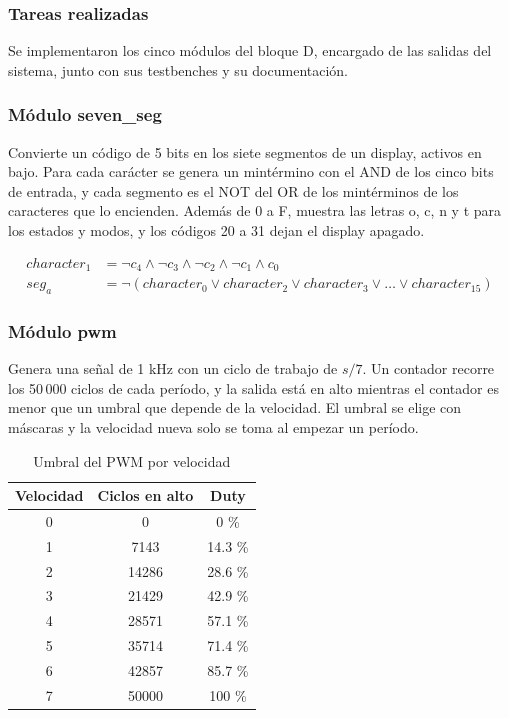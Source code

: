 \documentclass[11pt,letterpaper]{article}
\begin{document}
\subsubsection*{Tareas realizadas}

Se implementaron los cinco módulos del bloque D, encargado de las salidas del sistema, junto con sus testbenches y su documentación.

\subsubsection*{Módulo seven\_seg}

Convierte un código de 5 bits en los siete segmentos de un display, activos en bajo. Para cada carácter se genera un mintérmino con el AND de los cinco bits de entrada, y cada segmento es el NOT del OR de los mintérminos de los caracteres que lo encienden. Además de 0 a F, muestra las letras o, c, n y t para los estados y modos, y los códigos 20 a 31 dejan el display apagado.

\begin{align*}
character_1 &= \lnot c_4 \land \lnot c_3 \land \lnot c_2 \land \lnot c_1 \land c_0 \\
seg_a &= \lnot(character_0 \lor character_2 \lor character_3 \lor \ldots \lor character_{15})
\end{align*}

\subsubsection*{Módulo pwm}

Genera una señal de 1 kHz con un ciclo de trabajo de $s/7$. Un contador recorre los 50\,000 ciclos de cada período, y la salida está en alto mientras el contador es menor que un umbral que depende de la velocidad. El umbral se elige con máscaras y la velocidad nueva solo se toma al empezar un período.

\begin{table}[H]
\centering
\small
\caption{Umbral del PWM por velocidad}
\begin{tabular}{c c c}
\toprule
\textbf{Velocidad} & \textbf{Ciclos en alto} & \textbf{Duty} \\
\midrule
0 & 0 & 0 \% \\
1 & 7143 & 14.3 \% \\
2 & 14286 & 28.6 \% \\
3 & 21429 & 42.9 \% \\
4 & 28571 & 57.1 \% \\
5 & 35714 & 71.4 \% \\
6 & 42857 & 85.7 \% \\
7 & 50000 & 100 \% \\
\bottomrule
\end{tabular}
\end{table}
\end{document}
